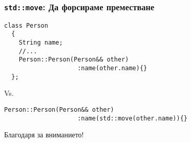 \documentclass{beamer}
\begin{document}
\begin{frame}[fragile]
  \frametitle{\texttt{std::move}: Да форсираме преместване}

\begin{lstlisting}[basicstyle=\small]
  class Person
  {
    String name;
    //...
    Person::Person(Person&& other)
                    :name(other.name){}
  };
\end{lstlisting}  

Vs.

\begin{lstlisting}[basicstyle=\small]
    Person::Person(Person&& other)
                    :name(std::move(other.name)){}
\end{lstlisting}  

\end{frame}


\begin{frame}
\centerline{Благодаря за вниманието!}
\end{frame}
\end{document}
